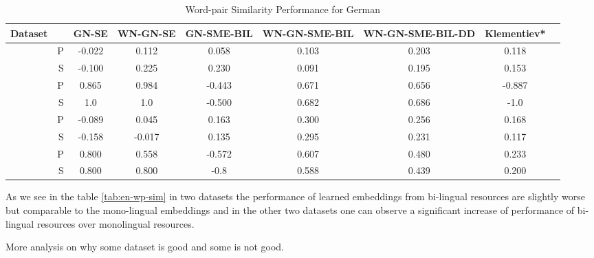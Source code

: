 \begin{table}[ht]
\caption{Word-pair Similarity Performance for German } %
\label{tbl:de-wp-sim}
\centering  %
\tabcolsep=0.09cm

\begin{tabular}{cr c c c c c c c} %
\hline\hline %
 Dataset & & GN-SE  & WN-GN-SE & GN-SME-BIL &  WN-GN-SME-BIL & WN-GN-SME-BIL-DD & Klementiev*
\\ [0.5ex] 
\hline %
                                 &  P & -0.022  & 0.112 & 0.058 & 0.103&0.203 &0.118 \\[-1ex]
\raisebox{1.5ex}{wortpaare222}  &  S & -0.100 & 0.225 & 0.230 & 0.091 & 0.195 &0.153 \\[1ex]

                                  &  P & 0.865 & 0.984 & -0.443 & 0.671 & 0.656 & -0.887 \\[-1ex]
\raisebox{1.5ex}{wortpaare30}    &  S & 1.0 & 1.0 & -0.500 & 0.682 & 0.686 & -1.0 \\[1ex]

                                  &  P & -0.089  & 0.045 & 0.163 & 0.300& 0.256 &0.168 \\[-1ex]
\raisebox{1.5ex}{wortpaare350}  &  S & -0.158 & -0.017  &  0.135 & 0.295 & 0.231 &0.117 \\[1ex]

                                &  P & 0.800  & 0.558 & -0.572 & 0.607 & 0.480 & 0.233 \\[-1ex]
\raisebox{1.5ex}{wortpaare65}  &  S & 0.800 & 0.800 & -0.8 & 0.588 & 0.439 &0.200 \\[1ex]


\hline %
     
          
\hline %
\end{tabular}


\end{table}      
          
            
As we see in the table \ref{tab:en-wp-sim} in two datasets the performance of learned embeddings from bi-lingual resources
are slightly worse but comparable to the mono-lingual embeddings and in the other two datasets one can observe a significant 
increase of performance of bi-lingual resources over monolingual resources.      


More analysis on why some dataset is good and some is not good. 